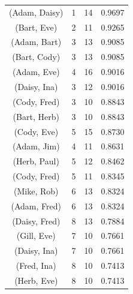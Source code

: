 \documentclass[12pt,oneside]{book}
\begin{document}
\begin{table}[t]
{\begin{tabular}{@{\hspace{.2cm}}ccc@{\hspace{.75cm}}c@{\hspace{.2cm}}}
(Adam, Daisy)	&	1&	14&	0.9697	\\ %
(Bart, Eve)	&	2&	11&	0.9265	\\ %
(Adam, Bart)	&	3&	13&	0.9085	\\ %
(Bart, Cody)	&	3&	13&	0.9085	\\ %
(Adam, Eve)	&	4&	16&	0.9016	\\ %
(Daisy, Ina)	&	3&	12&	0.9016	\\ %
(Cody, Fred)	&	3&	10&	0.8843	\\ %
(Bart, Herb)	&	3&	10&	0.8843	\\ %
(Cody, Eve)	&	5&	15&	0.8730	\\ %
(Adam, Jim)	&	4&	11&	0.8631	\\ %
(Herb, Paul)	&	5&	12&	0.8462	\\ %
(Cody, Fred)	&	5&	11&	0.8345	\\ %
(Mike, Rob)	&	6&	13&	0.8324	\\ %
(Adam, Fred)	&	6&	13&	0.8324	\\ %
(Daisy, Fred)	&	8&	13&	0.7884	\\ %
(Gill, Eve)		&	7&	10&	0.7661	\\ %
(Daisy, Ina)	&	7&	10&	0.7661	\\ %
(Fred, Ina)	&	8&	10&	0.7413	\\ %
(Herb, Eve)	&	8&	10&	0.7413	\\ %
\bottomrule
\end{tabular}
\label{tab:badtechpairs}
}\hspace{1.3cm}
%
\end{table}
\end{document}

